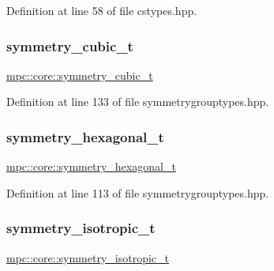 Definition at line 58 of file cstypes.\+hpp.

\mbox{\label{namespacempc_1_1core_a500c5dc401a79c05b1d1cbdba6f273eb}} 
\subsubsection{\texorpdfstring{symmetry\+\_\+cubic\+\_\+t}{symmetry\_cubic\_t}}
{\footnotesize\ttfamily \mbox{\hyperlink{namespacempc_1_1core_a500c5dc401a79c05b1d1cbdba6f273eb}{mpc\+::core\+::symmetry\+\_\+cubic\+\_\+t}}}



Definition at line 133 of file symmetrygrouptypes.\+hpp.

\mbox{\label{namespacempc_1_1core_a8def77cb2eb2da6f3f4fca3b77bedd52}} 
\subsubsection{\texorpdfstring{symmetry\+\_\+hexagonal\+\_\+t}{symmetry\_hexagonal\_t}}
{\footnotesize\ttfamily \mbox{\hyperlink{namespacempc_1_1core_a8def77cb2eb2da6f3f4fca3b77bedd52}{mpc\+::core\+::symmetry\+\_\+hexagonal\+\_\+t}}}



Definition at line 113 of file symmetrygrouptypes.\+hpp.

\mbox{\label{namespacempc_1_1core_a0d4476fe9836edb1425ecd07097c9330}} 
\subsubsection{\texorpdfstring{symmetry\+\_\+isotropic\+\_\+t}{symmetry\_isotropic\_t}}
{\footnotesize\ttfamily \mbox{\hyperlink{namespacempc_1_1core_a0d4476fe9836edb1425ecd07097c9330}{mpc\+::core\+::symmetry\+\_\+isotropic\+\_\+t}}}



